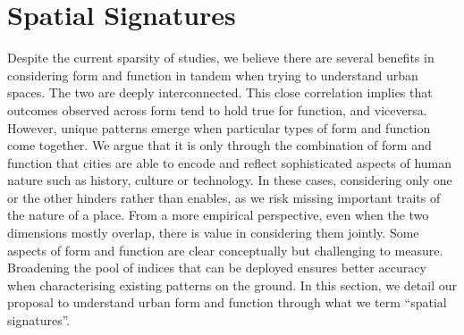 \section{Spatial Signatures}
\label{sec:ss}

Despite the current sparsity of studies, we believe there are several benefits
in considering form and function in tandem when trying to understand urban
spaces.
The two are deeply interconnected. This close
correlation implies that outcomes observed across form tend to hold true for
function, and viceversa. However, unique patterns emerge when particular types
of form and function come together.
We argue that it is only through the combination of form and function
that cities are able to encode and reflect sophisticated aspects of human
nature such as history, culture or technology.
%
In these cases, considering only one or the other hinders rather than enables,
as we risk missing important traits of the nature of a place.
From a more empirical perspective, even when the two dimensions mostly
overlap, there is value in considering them jointly. Some aspects of form and
function are clear conceptually but challenging to measure. Broadening the
pool of indices that can be deployed ensures better accuracy when
characterising existing patterns on the ground.
%
In this section, we detail our proposal to understand urban form and function
through what we term “spatial signatures”.


